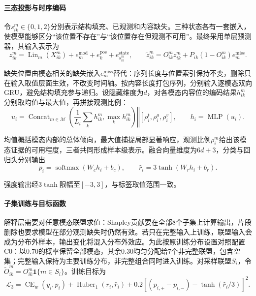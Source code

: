 \FloatBarrier
\paragraph{三态投影与时序编码}
令$s^m_{ik}\in\{0,1,2\}$分别表示结构填充、已观测和内容缺失。三种状态各有一套嵌入，使模型能够区分“该位置不存在”与“该位置存在但观测不可用”。最终采用单层预测器，其输入表示为
\begin{equation}
z^m_{ik}=\operatorname{Lin}_m(X^m_{ik})+e_m^{\mathrm{mod}}+e_k^{\mathrm{pos}}+e^{\mathrm{state}}_{s^m_{ik}},\qquad
\widetilde z^m_{ik}=O^m_{ik}z^m_{ik}+P_{ik}(1-O^m_{ik})e_m^{\mathrm{miss}}.
\end{equation}

缺失位置由模态相关的缺失嵌入$e_m^{\mathrm{miss}}$替代：序列长度与位置索引保持不变，删除只在输入取值层面生效，不改变时间轴。按内容长度打包序列，分别输入逐模态双向GRU，避免结构填充参与递归。设隐藏维度为$d$，对各模态内容位的编码结果$h^m_{ik}$分别取均值与最大值，再拼接观测比例：
\begin{equation}
u_i=\operatorname{Concat}_{m\in\mathcal M}\left(\frac1{L_i}\sum_kh^m_{ik},\max_kh^m_{ik}\right)
\mathbin\Vert[\rho_i^t,\rho_i^a,\rho_i^v],\qquad h_i=\operatorname{MLP}(u_i).
\end{equation}

均值概括模态内部的总体倾向，最大值捕捉局部显著响应，观测比例$\rho_i^m$给出该模态证据的可用程度，三者共同形成样本级表示。融合向量维度为$6d+3$，分类与回归头分别输出
\begin{equation}
p_i=\operatorname{softmax}(W_ch_i+b_c),\qquad \widehat r_i=3\tanh(W_rh_i+b_r).
\end{equation}

强度输出经$3\tanh$限幅至$[-3,3]$，与标签取值范围一致。

\FloatBarrier
\paragraph{子集训练与目标函数}
解释层需要对任意模态联盟求值：Shapley贡献要在全部8个子集上计算输出，片段删除也要求模型在部分观测缺失时仍然有效。若只在完整输入上训练，联盟输入会成为分布外样本，输出变化将混入分布外效应。为此按原训练分布设置对照配置C0：以0.70的概率保留全部模态，其余0.30均匀分配给7个非完整联盟，包含空集；完整输入保持为主要训练分布，非完整组合同时进入训练。对采样联盟$S_i$，令$\widetilde O^m_{ik}=O^m_{ik}\mathbf1\{m\in S_i\}$。训练目标为
\begin{equation}
\mathcal L_3=\operatorname{CE}_w(y_i,p_i)+\operatorname{Huber}_1(r_i,\widehat r_i)
+0.2\left[(p_{i,+}-p_{i,-})-\tanh(\widehat r_i/3)\right]^2.
\end{equation}

